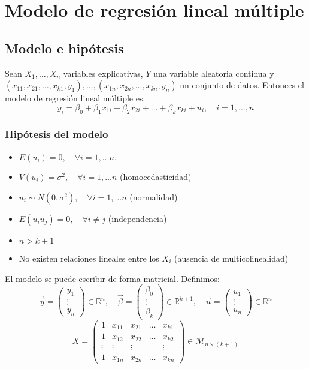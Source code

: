 \chapter{Modelo de regresión lineal múltiple}
\section{Modelo e hipótesis}
Sean $X_1, \dots, X_n$ variables explicativas, $Y$ una variable aleatoria continua y $(x_{11}, x_{21}, \dots, x_{k1}, y_1), \dots, (x_{1n}, x_{2n}, \dots, x_{kn}, y_n)$ un conjunto de datos.
Entonces el modelo de regresión lineal múltiple es:
$$y_i = \beta_0 + \beta_1 x_{1i} + \beta_2 x_{2i} + \dots + \beta_k x_{ki} + u_i, \quad i = 1, \dots, n$$

\subsection*{Hipótesis del modelo}
\begin{itemize}
    \item $E(u_i) = 0, \quad \forall i = 1, \dots n$.
    \item $V(u_i) = \sigma^2, \quad \forall i = 1, \dots n$ (homocedasticidad)
    \item $u_i \sim N(0, \sigma^2), \quad \forall i = 1, \dots n$ (normalidad)
    \item $E(u_i u_j) = 0, \quad \forall i \neq j$ (independencia)
    \item $n > k+1$
    \item No existen relaciones lineales entre los $X_i$ (ausencia de multicolinealidad)
\end{itemize}
El modelo se puede escribir de forma matricial.
Definimos:
$$\vec{y} = \begin{pmatrix}
        y_1 \\ \vdots \\ y_n
    \end{pmatrix} \in \mathbb{R}^n, \quad
    \vec{\beta} = \begin{pmatrix}
        \beta_0 \\ \vdots \\ \beta_k
    \end{pmatrix} \in \mathbb{R}^{k+1}, \quad
    \vec{u} = \begin{pmatrix}
        u_1 \\ \vdots \\ u_n
    \end{pmatrix} \in \mathbb{R}^n$$
$$X = \begin{pmatrix}
        1      & x_{11} & x_{21} & \dots & x_{k1} \\
        1      & x_{12} & x_{22} & \dots & x_{k2} \\
        \vdots & \vdots & \vdots &       & \vdots \\
        1      & x_{1n} & x_{2n} & \dots & x_{kn}
    \end{pmatrix} \in \mathcal{M}_{n \times (k+1)}$$
